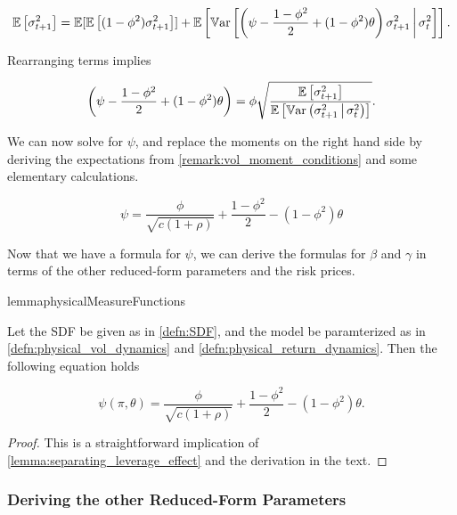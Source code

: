 \documentclass[11pt, letterpaper, twoside]{article}
\begin{document}
\begin{equation}
 \operatorname{\mathbb{E}}\left[\sigma^2_{t+1} \right] = \operatorname{\mathbb{E}}[ \operatorname{\mathbb{E}}\left[(1 - \phi^2) \sigma^2_{t+1} \right]] +
 \operatorname{\mathbb{E}}\left[\operatorname{\mathbb{V}ar}\left[\left(\psi - \frac{1-\phi^2}{2} + (1-\phi^2)\theta\right) \sigma^2_{t+1} \,\middle\vert\,
 \sigma^2_t\right]\right].
\end{equation}

Rearranging terms implies 

\begin{equation}
 \label{eqn:psi_tilde_eqn}
 \left(\psi - \frac{1-\phi^2}{2} + (1-\phi^2)\theta\right) = \phi \sqrt{\frac{\operatorname{\mathbb{E}}\left[\sigma^2_{t+1}
 \right]}{\operatorname{\mathbb{E}} \left[\operatorname{\mathbb{V}ar}\left(\sigma^2_{t+1} \,\middle\vert\, \sigma^2_t\right)\right]}}.
\end{equation}

We can now solve for $\psi$, and replace the moments on the right hand side by deriving the expectations from \cref{remark:vol_moment_conditions} and some elementary calculations. 

\begin{equation}
 \label{eqn:psi_pp_as_func_of_params}
 \psi = \frac{\phi}{\sqrt{c (1 + \rho)}} + \frac{1 - \phi^2}{2} - (1 - \phi^2) \theta
\end{equation}

Now that we have a formula for $\psi$, we can derive the formulas for $\beta$ and $\gamma$ in terms of the other reduced-form parameters and the risk prices. 

\begin{restatable}{lemma}{physicalMeasureFunctions}

 \label{lemma:psi_function}
 
 Let the SDF be given as in \cref{defn:SDF}, and the model be paramterized as in
 \cref{defn:physical_vol_dynamics} and \cref{defn:physical_return_dynamics}. 
 Then the following equation holds

 \begin{equation}
  \psi(\pi, \theta) = \frac{\phi}{\sqrt{c (1 + \rho)}} + \frac{1 - \phi^2}{2} - (1 - \phi^2) \theta. 
 \end{equation}
\end{restatable}

\begin{proof}
 This is a straightforward implication of \cref{lemma:separating_leverage_effect} and the derivation in the
 text.
\end{proof}

\subsubsection{Deriving the other Reduced-Form Parameters}
\end{document}

